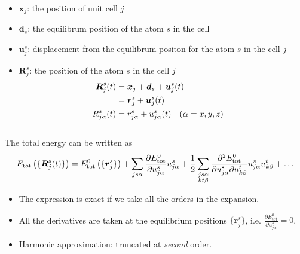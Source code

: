 \begin{frame}
\begin{columns}
    \begin{column}{0.45\textwidth}
      \begin{itemize}
      \item $\boldsymbol{x}_j$: the position of unit cell $j$
      \item $\boldsymbol{d}_s$: the equilibrum position of the atom $s$ in the cell
      \item $\boldsymbol{u}_{j}^s$: displacement from the equilibrum positon for the atom $s$ in the cell $j$
      \item $\boldsymbol{R}_{j}^s$: the position of the atom $s$ in the cell $j$
        \begin{align*}
          \boldsymbol{R}_{j}^s(t) &= \boldsymbol{x}_j + \boldsymbol{d}_s
                                + \boldsymbol{u}_{j}^s(t) \cr
                                  &= \boldsymbol{r}_j^s + \boldsymbol{u}_{j}^s(t)  \cr
          {R}_{j\alpha}^s(t) &= {r}_{j\alpha}^s + {u}_{j\alpha}^s(t) 
          \quad (\alpha= x,y,z)
        \end{align*}
      \end{itemize}
    \end{column}
  \end{columns}

  \bigskip
  The total energy can be written as
  \begin{equation*}
    E_{\text{tot}}\left(\{\boldsymbol{R}_j^s(t)\}\right) = 
    E^0_{\text{tot}}\left(\{\boldsymbol{r}_j^s\}\right) +
    \sum_{js\alpha} \frac{
      \partial E^0_{\text{tot}} %
    }{
      \partial {u}_{j\alpha}^s
    } {{u}_{j\alpha}^s} +
    {1\over2} \sum_{\substack{js\alpha \\ kt\beta}}
    \frac{
      \partial^2 E^0_{\text{tot}} %
    }{
      \partial {u}_{j\alpha}^s
      \partial {u}_{k\beta}^t
    } \tikzmark{IFC}
    {{u}_{j\alpha}^s} {{u}_{k\beta}^t}
    + \ldots
  \end{equation*}
  \vspace{-6pt}


  \begin{itemize}
  \item The expression is exact if we take all the orders in the expansion.
  \item All the derivatives are taken at the equilibrium positions
    $\{\boldsymbol{r}_j^s\}$, i.e. $
    \frac{
      \partial E^0_{\text{tot}}
    }{
      \partial
      {u}_{j\alpha}^s
    }=0$. 
  \item Harmonic approximation: truncated at \emph{second} order.
  \end{itemize}
\end{frame}